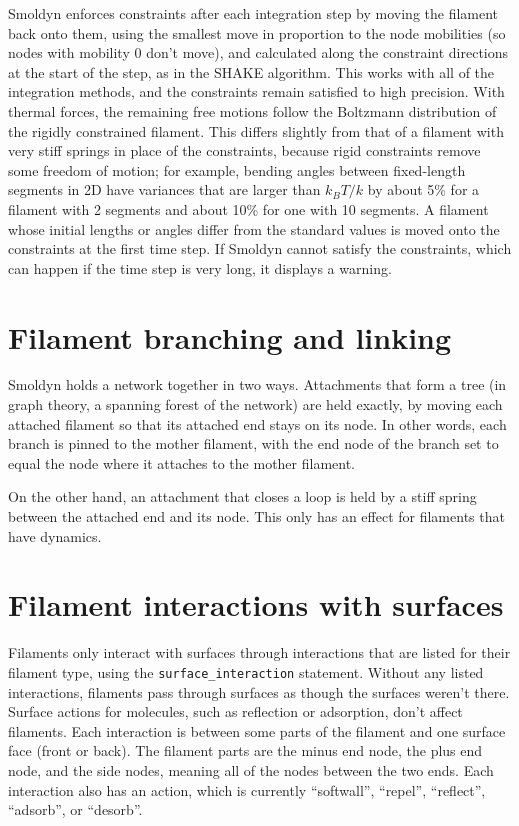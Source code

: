 \documentclass {scrbook}
\newcommand {\ttt} {\texttt}
\begin{document}
Smoldyn enforces constraints after each integration step by moving the filament back onto them, using the smallest move in proportion to the node mobilities (so nodes with mobility 0 don't move), and calculated along the constraint directions at the start of the step, as in the SHAKE algorithm. This works with all of the integration methods, and the constraints remain satisfied to high precision. With thermal forces, the remaining free motions follow the Boltzmann distribution of the rigidly constrained filament. This differs slightly from that of a filament with very stiff springs in place of the constraints, because rigid constraints remove some freedom of motion; for example, bending angles between fixed-length segments in 2D have variances that are larger than $k_BT/k$ by about 5\% for a filament with 2 segments and about 10\% for one with 10 segments. A filament whose initial lengths or angles differ from the standard values is moved onto the constraints at the first time step. If Smoldyn cannot satisfy the constraints, which can happen if the time step is very long, it displays a warning.

\section{Filament branching and linking}

Smoldyn holds a network together in two ways. Attachments that form a tree (in graph theory, a spanning forest of the network) are held exactly, by moving each attached filament so that its attached end stays on its node. In other words, each branch is pinned to the mother filament, with the end node of the branch set to equal the node where it attaches to the mother filament.

On the other hand, an attachment that closes a loop is held by a stiff spring between the attached end and its node. This only has an effect for filaments that have dynamics.


\section{Filament interactions with surfaces}
\label{sec:FilSurfInteractions}

Filaments only interact with surfaces through interactions that are listed for their filament type, using the \ttt{surface\_interaction} statement. Without any listed interactions, filaments pass through surfaces as though the surfaces weren't there. Surface actions for molecules, such as reflection or adsorption, don't affect filaments. Each interaction is between some parts of the filament and one surface face (front or back). The filament parts are the minus end node, the plus end node, and the side nodes, meaning all of the nodes between the two ends. Each interaction also has an action, which is currently ``softwall'', ``repel'', ``reflect'', ``adsorb'', or ``desorb''.
\end{document}
